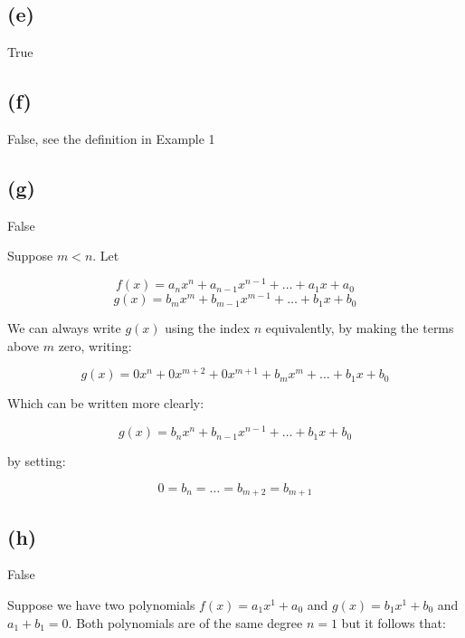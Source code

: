 \documentclass{article}
\begin{document}
\subsection*{(e)}

True

\subsection*{(f)}

False, see the definition in Example 1

\subsection*{(g)}

False

Suppose \(m < n\). Let

\begin{equation*}
    f(x) = a_{n}x^{n} + a_{n-1}x^{n-1} + \dots + a_{1}x + a_{0}
\end{equation*}
\begin{equation*}
    g(x) = b_{m}x^{m} + b_{m-1}x^{m-1} + \dots + b_{1}x + b_{0}
\end{equation*}

We can always write \(g(x)\) using the index \(n\) equivalently, by making the terms above \(m\) zero, writing:

\begin{equation*}
    g(x) = 0x^{n} + 0x^{m+2} + 0x^{m+1} + b_{m}x^{m} + \dots + b_{1}x + b_{0}
\end{equation*}

Which can be written more clearly:

\begin{equation*}
    g(x) = b_{n}x^{n} + b_{n-1}x^{n-1} + \dots + b_{1}x + b_{0}
\end{equation*}

by setting:

\begin{equation*}
    0 = b_{n} = \dots = b_{m+2} = b_{m + 1}
\end{equation*}

\subsection*{(h)}

False

Suppose we have two polynomials \(f(x) = a_{1}x^{1} + a_{0}\) and \(g(x) = b_{1}x^{1} + b_{0}\)
and \(a_1 + b_{1} = 0\). Both polynomials are of the same degree \(n = 1\) but it follows that:
\end{document}
